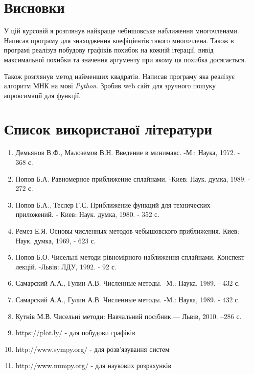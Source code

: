 \documentclass[ukrainian,14pt]{extarticle}
\begin{document}
\section*{Висновки}
У цій курсовій я розглянув найкраще чебишовське наближення многочленами. Написав програму для знаходження коефіцієнтів такого многочлена. Також в програмі реалізув побудову графіків похибок на кожній ітерації, вивід максимальної похибки та значення аргументу при якому ця похибка досягається.

Також розглянув метод найменших квадратів. Написав програму яка реалізує алгоритм МНК на мові \textit{Python}. Зробив web сайт для зручного пошуку апроксимації для функції.

\newpage

\section*{Список використаної літератури}

\begin{enumerate}
\item  Демьянов В.Ф., Малоземов В.Н. Введение в минимакс. -М.: Наука, 1972. - 368 с.
\item Попов Б.А. Равномерное приближение сплайнами. -Киев: Наук. думка, 1989. - 272 с.
\item Попов Б.А., Теслер Г.С. Приближение функций для технических приложений. - Киев: Наук. думка, 1980. - 352 с.
\item Ремез Е.Я. Основы численных методов чебышовского приближения. Киев: Наук. думка, 1969, - 623 с.
\item Попов Б.О. Чисельні методи рівномірного наближення сплайнами. Конспект лекцій. -Львів: ЛДУ, 1992. - 92 с.
\item Самарский А.А., Гулин А.В. Численные методы. -М.: Наука, 1989. - 432 с.
\item Самарский А.А., Гулин А.В. Численные методы. -М.: Наука, 1989. - 432 с.
\item Кутнів М.В. Чисельнi методи: Навчальний посiбник.— Львiв, 2010. –286 с.

\item https://plot.ly/ - для побудови графіків
\item http://www.sympy.org/ - для розв'язування систем
\item http://www.numpy.org/ - для наукових розрахунків
\end{enumerate}
\end{document}
